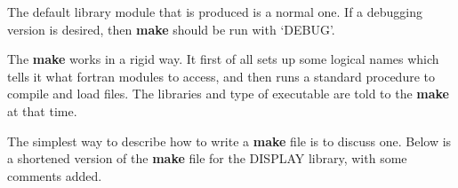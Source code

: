 The default library module that is produced is a normal one.
If a debugging version is desired, then {\bf make}
should be run with \mbox{`\@make\hspace{0.5em}DEBUG'}. 

\vspace*{3mm}

The {\bf make} works in a rigid way. It first of all sets up some logical 
names which tells it what fortran modules to access, and then runs a 
standard procedure to compile and load files. The libraries and type of
executable are told to the {\bf make} at that time. 

The simplest way to describe how to write a {\bf make} file is to discuss
one. Below is a shortened version of the {\bf make} file for the DISPLAY
library, with some comments added.

